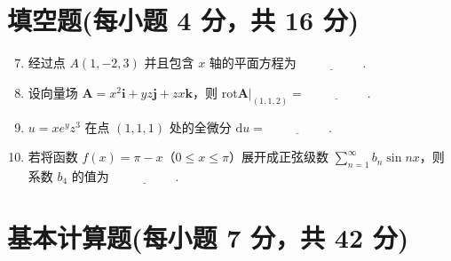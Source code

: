 \documentclass[../main.tex]{subfiles}
\begin{document}
\section{填空题(每小题 4 分，共 16 分)}
\begin{enumerate}
    \setcounter{enumi}{6}
    \item 经过点 \( A(1,-2,3) \) 并且包含 \( x \) 轴的平面方程为 \(\underline{\hspace{5em}}\).
          \vspace{1em}

    \item 设向量场 \( \boldsymbol{A} = x^2 \boldsymbol{i} + y z \boldsymbol{j} + z x \boldsymbol{k} \)，则 \(  \text{rot}\boldsymbol{A} \Big|_{(1,1,2)} = \underline{\hspace{5em}}\).
          \vspace{1em}

    \item \( u = x e^{y}z^3 \) 在点 \( (1,1,1) \) 处的全微分 \( \mathrm{d}u = \underline{\hspace{5em}}\).
          \vspace{1em}

    \item 若将函数 \( f(x) = \pi - x \)（\( 0 \leq x \leq \pi \)）展开成正弦级数 \( \sum \limits_{n=1}^{\infty} b_n \sin nx \)，则系数 \( b_4 \) 的值为 \(\underline{\hspace{5em}}\).
          \vspace{1em}
\end{enumerate}

\section{基本计算题(每小题 7 分，共 42 分)}
\end{document}
